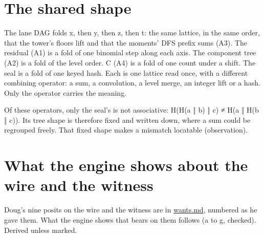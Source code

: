 \section{\texorpdfstring{The shared shape}{The shared shape}}

The lane DAG folds x, then y, then z, then t: the same lattice, in the same order, that the tower's floors lift and that the moments' DFS prefix sums (A3). The residual (A1) is a fold of one binomial step along each axis. The component tree (A2) is a fold of the level order. C (A4) is a fold of one count under a shift. The seal is a fold of one keyed hash. Each is one lattice read once, with a different combining operator: a sum, a convolution, a level merge, an integer lift or a hash. Only the operator carries the meaning.

Of these operators, only the seal's is not associative: H(H(a ‖ b) ‖ c) ≠ H(a ‖ H(b ‖ c)). Its tree shape is therefore fixed and written down, where a sum could be regrouped freely. That fixed shape makes a mismatch locatable (observation).

\section{\texorpdfstring{What the engine shows about the wire and the witness}{What the engine shows about the wire and the witness}}

Doug's nine posits on the wire and the witness are in \hyperref[chap:wants]{wants.md}, numbered as he gave them. What the engine shows that bears on them follows (a to g, checked). Derived unless marked.

